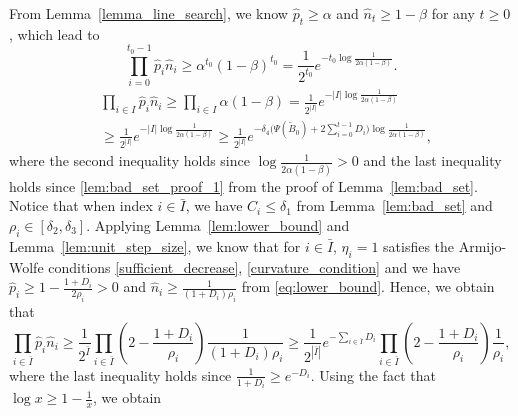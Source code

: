 \documentclass[11pt,letterpaper]{article}
\newcommand\0{{\Vector{0}}}
\newcommand\1{{\Vector{1}}}
\numberwithin{assumption}{section}
\numberwithin{definition}{section}
\numberwithin{theorem}{section}
\numberwithin{remark}{section}
\begin{document}
    From Lemma~\ref{lemma_line_search}, we know $\hat{p}_t \geq \alpha$ and $\hat{n}_t\geq 1 - \beta$ for any $t \geq 0$, which lead to
    \begin{equation}\label{proposition_4_4}
        \prod_{i = 0}^{t_0 - 1} \hat{p}_i\hat{n}_i \geq \alpha^{t_0} (1 - \beta)^{t_0} = \frac{1}{2^{t_0}}e^{-t_0\log{\frac{1}{2\alpha(1 - \beta)}}}.
    \end{equation}
    \begin{equation}\label{proposition_4_5}
    \begin{split}
        & \prod_{i \in I} \hat{p}_i\hat{n}_i \geq \prod_{i \in I} \alpha(1 - \beta) = \frac{1}{2^{|I|}}e^{-|I|\log{\frac{1}{2\alpha(1 - \beta)}}} \\
        & \geq \frac{1}{2^{|I|}}e^{-|I|\log{\frac{1}{2\alpha(1 - \beta)}}} \geq \frac{1}{2^{|I|}}e^{-\delta_4\Big(\Psi(\tilde{B}_{0}) + 2\sum_{i = 0}^{t - 1}D_i\Big)\log{\frac{1}{2\alpha(1 - \beta)}}},
    \end{split}
    \end{equation}
    where the second inequality holds since $\log{\frac{1}{2\alpha(1 - \beta)}} > 0$ and the last inequality holds since \eqref{lem:bad_set_proof_1} from the proof of Lemma~\ref{lem:bad_set}. Notice that when index $i \in \bar{I}$, we have $C_i \leq \delta_1$ from Lemma~\ref{lem:bad_set} and $\rho_i \in [\delta_2, \delta_3]$. Applying Lemma~\ref{lem:lower_bound} and Lemma~\ref{lem:unit_step_size}, we know that for $i \in \bar{I}$, $\eta_i = 1$ satisfies the Armijo-Wolfe conditions \eqref{sufficient_decrease}, \eqref{curvature_condition} and we have $\hat{p}_i \geq 1 - \frac{1 + D_i}{2\rho_i} > 0$ and $\hat{n}_i \geq \frac{1}{(1 + D_i)\rho_i}$ from \eqref{eq:lower_bound}. Hence, we obtain that
    \begin{equation}\label{proposition_4_6}
        \prod_{i \in \bar{I}} \hat{p}_i\hat{n}_i \geq \frac{1}{2^{\bar{I}}}\prod_{i \in \bar{I}}(2 - \frac{1 + D_i}{\rho_i})\frac{1}{(1 + D_i)\rho_i} \geq \frac{1}{2^{|\bar{I}|}}e^{-\sum_{i \in \bar{I}}D_i}\prod_{i \in \bar{I}}(2 - \frac{1 + D_i}{\rho_i})\frac{1}{\rho_i},
    \end{equation}
    where the last inequality holds since $\frac{1}{1 + D_i} \geq e^{-D_i}$. Using the fact that $\log{x} \geq 1 - \frac{1}{x}$, we obtain
\end{document}
